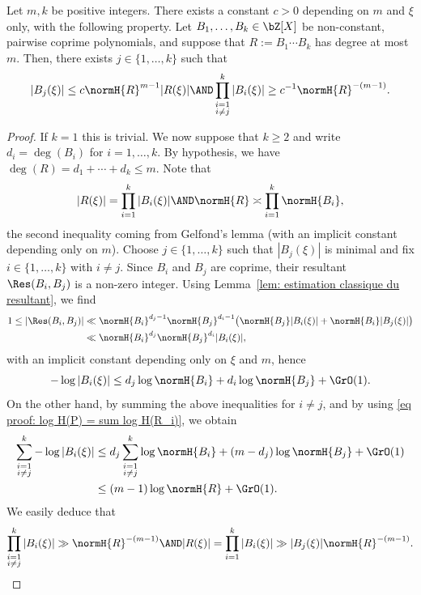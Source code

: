 \begin{Lem}
\label{lem: lem general 2}
Let $m,k$ be positive integers. There exists a constant $c>0$ depending on $m$ and $\xi$ only, with the following property. Let $B_1,\dots,B_k\in\bZ[X]$ be non-constant, pairwise coprime polynomials, and suppose that $R:= B_1\cdots B_k$ has degree at most $m$. Then, there exists $j\in\{1,\dots,k\}$ such that
\[
|B_j(\xi)| \leq c\normH{R}^{m-1}|R(\xi)| \AND \prod_{\substack{i=1 \\ i\neq j}}^{k} |B_i(\xi)| \geq c^{-1}\normH{R}^{-(m-1)}.
\]
\end{Lem}

\begin{proof}
If $k=1$ this is trivial. We now suppose that $k\geq 2$ and write $d_i = \deg(B_i)$ for $i=1,\dots, k$. By hypothesis, we have $\deg(R) = d_1+\cdots + d_k \leq m$. Note that
\begin{equation}
\label{eq proof: log H(P) = sum log H(R_i)}
|R(\xi)| = \prod_{i=1}^{k} |B_i(\xi)| \AND \normH{R} \asymp \prod_{i=1}^{k} \normH{B_i},
\end{equation}
the second inequality coming from Gelfond's lemma (with an implicit constant depending only on $m$). Choose $j\in\{1,\dots,k\}$ such that $|B_j(\xi)|$ is minimal and fix $i\in\{1,\dots,k\}$ with $i\neq j$. Since $B_i$ and $B_j$ are coprime, their resultant $\Res(B_i,B_j)$ is a non-zero integer. Using Lemma~\ref{lem: estimation classique du resultant}, we find
\begin{align*}
1 \leq |\Res(B_i,B_j)| & \ll \normH{B_i}^{d_j-1} \normH{B_j}^{d_i-1}\big( \normH{B_j}|B_i(\xi)| + \normH{B_i}|B_j(\xi)|\big) \\
& \ll \normH{B_i}^{d_j} \normH{B_j}^{d_i}|B_i(\xi)|,
\end{align*}
with an implicit constant depending only on $\xi$ and $m$, hence
\[
-\log |B_i(\xi)| \leq d_j\log \normH{B_i} + d_i\log \normH{B_j} + \GrO(1).
\]
On the other hand, by summing the above inequalities for $i\neq j$, and by using \eqref{eq proof: log H(P) = sum log H(R_i)}, we obtain
\begin{align*}
\sum_{\substack{i=1 \\ i\neq j}}^{k} -\log |B_i(\xi)|
& \leq d_j\sum_{\substack{i=1 \\ i\neq j}}^{k} \log \normH{B_i} +(m-d_j) \log \normH{B_j} + \GrO(1) \\
& \leq (m-1)\log \normH{R} + \GrO(1).
\end{align*}
We easily deduce that
\[
\prod_{\substack{i=1 \\ i\neq j}}^{k} |B_i(\xi)| \gg \normH{R}^{-(m-1)} \AND
|R(\xi)| = \prod_{i=1}^{k}|B_i(\xi)| \gg |B_j(\xi)| \normH{R}^{- (m-1)}.\qedhere
\]
\end{proof}

